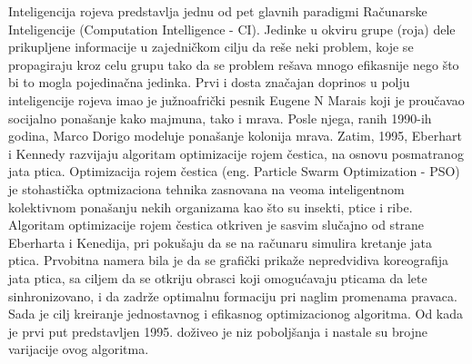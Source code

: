 \documentclass[a4paper]{article}
\begin{document}
Inteligencija rojeva predstavlja jednu od pet glavnih paradigmi Računarske Inteligencije (Computation Intelligence - CI). Jedinke u okviru grupe (roja) dele prikupljene informacije u zajedničkom cilju da reše neki problem, koje se propagiraju kroz celu grupu tako da se problem rešava mnogo efikasnije nego što bi to mogla pojedinačna jedinka.
Prvi i dosta značajan doprinos u polju inteligencije rojeva imao je južnoafrički pesnik Eugene N Marais koji je proučavao socijalno ponašanje kako majmuna, tako i mrava. Posle njega, ranih 1990-ih godina, Marco Dorigo modeluje ponašanje kolonija mrava. Zatim, 1995, Eberhart i Kennedy razvijaju algoritam optimizacije rojem čestica, na osnovu posmatranog jata ptica.
Optimizacija rojem čestica (eng. Particle Swarm Optimization - PSO) je stohastička optmizaciona tehnika zasnovana na veoma inteligentnom kolektivnom ponašanju nekih organizama kao što su insekti, ptice i ribe. Algoritam optimizacije rojem čestica otkriven je sasvim slučajno od strane Eberharta i Kenedija, pri pokušaju da se na računaru simulira kretanje jata ptica. Prvobitna namera bila je da se grafički prikaže nepredvidiva koreografija jata ptica, sa ciljem da se otkriju obrasci koji omogućavaju pticama da lete sinhronizovano, i da zadrže optimalnu formaciju pri naglim promenama pravaca. Sada je cilj kreiranje jednostavnog i efikasnog optimizacionog algoritma. Od kada je prvi put predstavljen 1995. doživeo je niz poboljšanja i nastale su brojne varijacije ovog algoritma. 
\end{document}
